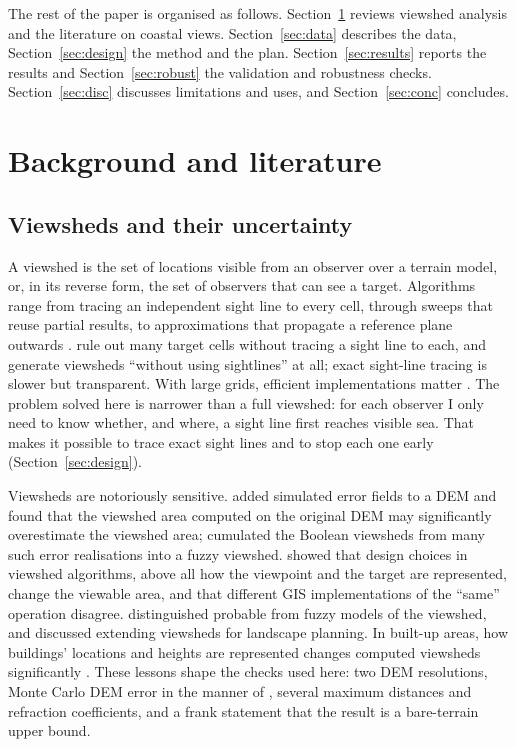 The rest of the paper is organised as follows. Section~\ref{sec:lit} reviews viewshed analysis and the literature on coastal views. Section~\ref{sec:data} describes the data, Section~\ref{sec:design} the method and the plan. Section~\ref{sec:results} reports the results and Section~\ref{sec:robust} the validation and robustness checks. Section~\ref{sec:disc} discusses limitations and uses, and Section~\ref{sec:conc} concludes.

\section{Background and literature}\label{sec:lit}
\subsection{Viewsheds and their uncertainty}
A viewshed is the set of locations visible from an observer over a terrain model, or, in its reverse form, the set of observers that can see a target. Algorithms range from tracing an independent sight line to every cell, through sweeps that reuse partial results, to approximations that propagate a reference plane outwards \citep{franklin1994,vankreveld1996,wang1996,wang2000,defloriani2003}. \citet{wang1996} rule out many target cells without tracing a sight line to each, and \citet{wang2000} generate viewsheds ``without using sightlines'' at all; exact sight-line tracing is slower but transparent. With large grids, efficient implementations matter \citep{tabik2013}. The problem solved here is narrower than a full viewshed: for each observer I only need to know whether, and where, a sight line first reaches visible sea. That makes it possible to trace exact sight lines and to stop each one early (Section~\ref{sec:design}).

Viewsheds are notoriously sensitive. \citet{fisher1991} added simulated error fields to a DEM and found that the viewshed area computed on the original DEM may significantly overestimate the viewshed area; \citet{fisher1992} cumulated the Boolean viewsheds from many such error realisations into a fuzzy viewshed. \citet{fisher1993} showed that design choices in viewshed algorithms, above all how the viewpoint and the target are represented, change the viewable area, and that different GIS implementations of the ``same'' operation disagree. \citet{fisher1994} distinguished probable from fuzzy models of the viewshed, and \citet{fisher1996} discussed extending viewsheds for landscape planning. In built-up areas, how buildings' locations and heights are represented changes computed viewsheds significantly \citep{sander2007}. These lessons shape the checks used here: two DEM resolutions, Monte Carlo DEM error in the manner of \citet{fisher1991,fisher1992}, several maximum distances and refraction coefficients, and a frank statement that the result is a bare-terrain upper bound.

